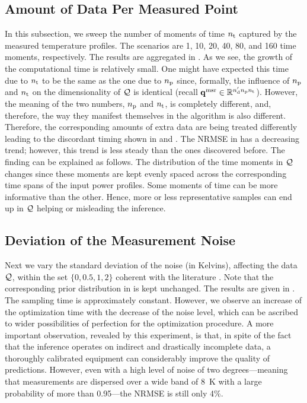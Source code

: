 \subsection{Amount of Data Per Measured Point}
In this subsection, we sweep the number of moments of time ${n_\text{t}}$ captured by the measured temperature profiles.
The scenarios are 1, 10, 20, 40, 80, and 160 time moments, respectively.
The results are aggregated in .
As we see, the growth of the computational time is relatively small.
One might have expected this time due to ${n_\text{t}}$ to be the same as the one due to ${n_\text{p}}$ since, formally, the influence of ${n_\text{p}}$ and ${n_\text{t}}$ on the dimensionality of $\mathcal{Q}$ is identical (recall $\mathbf{q}^{\text{msr}} \in \mathbb{R}^{{n_\text{d}'} {n_\text{p}} {n_\text{t}}}$).
However, the meaning of the two numbers, ${n_\text{p}}$ and ${n_\text{t}}$, is completely different, and, therefore, the way they manifest themselves in the algorithm is also different.
Therefore, the corresponding amounts of extra data are being treated differently leading to the discordant timing shown in  and .
The NRMSE in  has a decreasing trend; however, this trend is less steady than the ones discovered before. The finding can be explained as follows.
The distribution of the time moments in $\mathcal{Q}$ changes since these moments are kept evenly spaced across the corresponding time spans of the input power profiles.
Some moments of time can be more informative than the other.
Hence, more or less representative samples can end up in $\mathcal{Q}$ helping or misleading the inference.

\subsection{Deviation of the Measurement Noise}
Next we vary the standard deviation of the noise (in Kelvins), affecting the data $\mathcal{Q}$, within the set $\{ 0, 0.5, 1, 2 \}$ coherent with the literature \cite{mesa-martinez2007}. Note that the corresponding prior distribution in  is kept unchanged. The results are given in .
The sampling time is approximately constant. However, we observe an increase of the optimization time with the decrease of the noise level, which can be ascribed to wider possibilities of perfection for the optimization procedure.
A more important observation, revealed by this experiment, is that, in spite of the fact that the inference operates on indirect and drastically incomplete data, a thoroughly calibrated equipment can considerably improve the quality of predictions.
However, even with a high level of noise of two degrees---meaning that measurements are dispersed over a wide band of 8~K with a large probability of more than 0.95---the NRMSE is still only 4\%.

